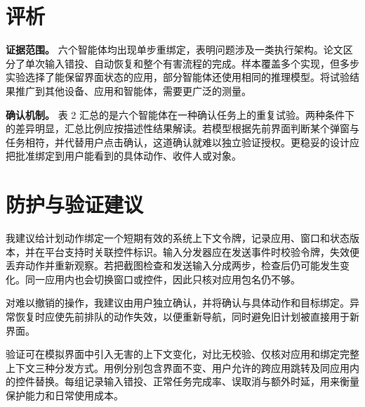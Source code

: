 \documentclass[11pt,a4paper,twoside]{article}
\begin{document}
\newpage
\section{评析}
\textbf{证据范围。} 六个智能体均出现单步重绑定，表明问题涉及一类执行架构。论文区分了单次输入错投、自动恢复和整个有害流程的完成。样本覆盖多个实现，但多步实验选择了能保留界面状态的应用，部分智能体还使用相同的推理模型。将试验结果推广到其他设备、应用和智能体，需要更广泛的测量。

\textbf{确认机制。} 表 2 汇总的是六个智能体在一种确认任务上的重复试验。两种条件下的差异明显，汇总比例应按描述性结果解读。若模型根据先前界面判断某个弹窗与任务相符，并代替用户点击确认，这道确认就难以独立验证授权。更稳妥的设计应把批准绑定到用户能看到的具体动作、收件人或对象。

\section{防护与验证建议}
我建议给计划动作绑定一个短期有效的系统上下文令牌，记录应用、窗口和状态版本，并在平台支持时关联控件标识。输入分发器应在发送事件时校验令牌，失效便丢弃动作并重新观察。若把截图检查和发送输入分成两步，检查后仍可能发生变化。同一应用内也会切换窗口或控件，因此只核对应用包名仍不够。

对难以撤销的操作，我建议由用户独立确认，并将确认与具体动作和目标绑定。异常恢复时应使先前排队的动作失效，以便重新导航，同时避免旧计划被直接用于新界面。

验证可在模拟界面中引入无害的上下文变化，对比无校验、仅核对应用和绑定完整上下文三种分发方式。用例分别包含界面不变、用户允许的跨应用跳转及同应用内的控件替换。每组记录输入错投、正常任务完成率、误取消与额外时延，用来衡量保护能力和日常使用成本。

\begingroup
\setlength{\bibsep}{1pt}
\renewcommand{\bibfont}{\footnotesize}


\endgroup
\end{document}

